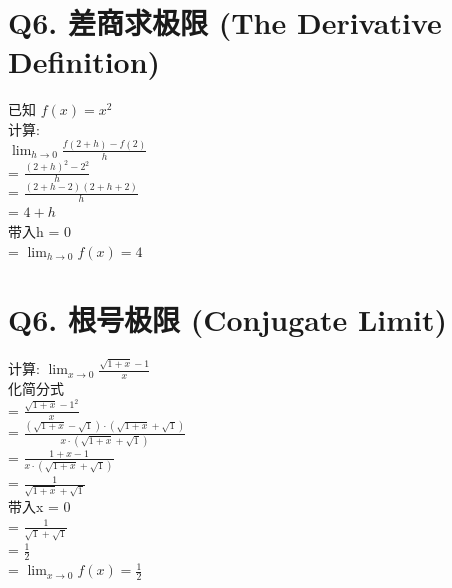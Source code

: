 \documentclass[12pt]{article}
\begin{document}
\section*{Q6. 差商求极限 (The Derivative Definition)}
已知 $f(x) = x^{2}$ \\
计算:\\
$\lim_{h \to 0}\frac{f(2+h)-f(2)}{h}$ \\
= $\frac{(2+h)^{2} - 2^{2}}{h}$ \\ 
= $\frac{(2+h-2)(2+h+2)}{h}$ \\ 
= $4+h$ \\ 
带入h = 0  \\ 
= $\lim_{h \to 0} f(x) = 4$ \\  

\section*{Q6. 根号极限 (Conjugate Limit)}
计算:
$\lim_{x \to 0}\frac{\sqrt{1+x}-1}{x}$ \\ 
化简分式 \\ 
= $\frac{\sqrt{1+x}- 1^{2}}{x}$ \\   
= $\frac{(\sqrt{1+x}- \sqrt{1}) \cdot (\sqrt{1+x}+ \sqrt{1})}{x\cdot (\sqrt{1+x} + \sqrt{1})}$\\
= $\frac{1+x-1}{x\cdot (\sqrt{1+x} + \sqrt{1})}$\\
= $\frac{1}{\sqrt{1+x} + \sqrt{1}}$\\
带入x = 0 \\ 
 = $\frac{1}{\sqrt{1} + \sqrt{1}}$ \\ 
 = $\frac{1}{2}$ \\ 
 = $\lim_{x \to 0}f(x) = \frac{1}{2}$ \\
\end{document}
